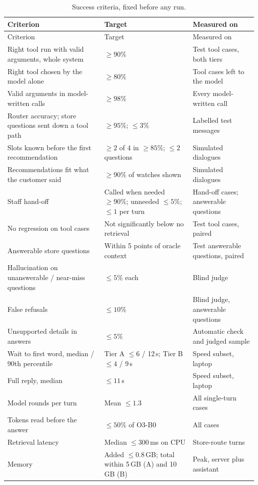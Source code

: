 \documentclass[11pt,a4paper]{article}
\begin{document}
{\small
\begin{xltabular}{\textwidth}{>{\raggedright\arraybackslash}p{6.0cm} >{\raggedright\arraybackslash}p{3.8cm} L}
\caption{Success criteria, fixed before any run.}\label{tab:criteria}\\
\toprule
Criterion & Target & Measured on \\
\midrule
\endfirsthead
\toprule Criterion & Target & Measured on \\ \midrule \endhead
Right tool run with valid arguments, whole system & $\ge 90\%$ & Test tool cases, both tiers \\
Right tool chosen by the model alone & $\ge 80\%$ & Tool cases left to the model \\
Valid arguments in model-written calls & $\ge 98\%$ & Every model-written call \\
Router accuracy; store questions sent down a tool path & $\ge 95\%$; $\le 3\%$ & Labelled test messages \\
Slots known before the first recommendation & $\ge 2$ of 4 in $\ge 85\%$; $\le 2$ questions & Simulated dialogues \\
Recommendations fit what the customer said & $\ge 90\%$ of watches shown & Simulated dialogues \\
Staff hand-off & Called when needed $\ge 90\%$; unneeded $\le 5\%$; $\le 1$ per turn & Hand-off cases; answerable
questions \\
No regression on tool cases & Not significantly below no retrieval & Test tool cases, paired \\
Answerable store questions & Within 5 points of oracle context & Test answerable questions, paired \\
Hallucination on unanswerable / near-miss questions & $\le 5\%$ each & Blind judge \\
False refusals & $\le 10\%$ & Blind judge, answerable questions \\
Unsupported details in answers & $\le 5\%$ & Automatic check and judged sample \\
Wait to first word, median / 90th percentile & Tier A $\le 6$ / 12\,s; Tier B $\le 4$ / 9\,s & Speed subset, laptop \\
Full reply, median & $\le 11$\,s & Speed subset, laptop \\
Model rounds per turn & Mean $\le 1.3$ & All single-turn cases \\
Tokens read before the answer & $\le 50\%$ of O3-B0 & All cases \\
Retrieval latency & Median $\le 300$\,ms on CPU & Store-route turns \\
Memory & Added $\le 0.8$\,GB; total within 5\,GB (A) and 10\,GB (B) & Peak, server plus assistant \\
\bottomrule
\end{xltabular}}
\end{document}
